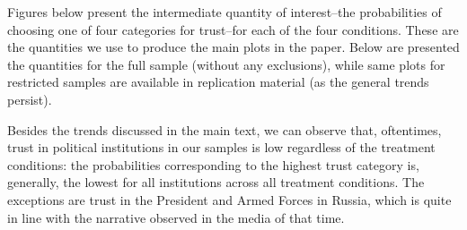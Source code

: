 \documentclass[11pt, ngerman,english,a4]{article}
\begin{document}


\clearpage




% 

\newpage

% 


\clearpage

Figures below present the intermediate quantity of interest--the probabilities of choosing one of four categories for trust--for each of the four conditions. These are the quantities we use to produce the main plots in the paper. Below are presented the quantities for the full sample (without any exclusions), while same plots for restricted samples are available in replication material (as the general trends persist). 

Besides the trends discussed in the main text, we can observe that, oftentimes, trust in political institutions in our samples is low regardless of the treatment conditions: the probabilities corresponding to the highest trust category is, generally, the lowest for all institutions across all treatment conditions. The exceptions are trust in the President and Armed Forces in Russia, which is quite in line with the narrative observed in the media of that time. 
\end{document}
